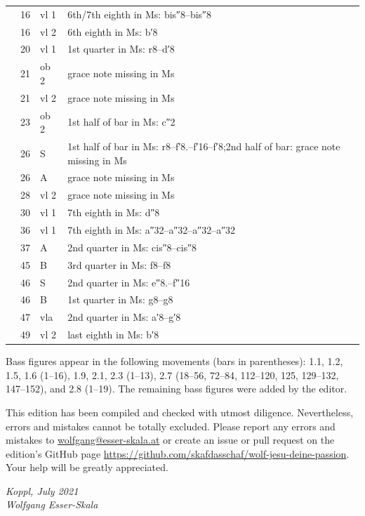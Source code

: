 \documentclass[parskip=full]{scrreprt}
\begin{document}
\begin{longtable}{lll L{10cm}}
       & 16  & vl 1    & 6th/7th eighth in Ms: bis″8–bis″8 \\
       & 16  & vl 2    & 6th eighth in Ms: b′8 \\
       & 20  & vl 1    & 1st quarter in Ms: r8–d′8 \\
       & 21  & ob 2    & grace note missing in Ms \\
       & 21  & vl 2    & grace note missing in Ms \\
       & 23  & ob 2    & 1st half of bar in Ms: c″2 \\
       & 26  & S       & 1st half of bar in Ms: r8–f′8.–f′16–f′8;\newline 2nd half of bar: grace note missing in Ms \\
       & 26  & A       & grace note missing in Ms \\
       & 28  & vl 2    & grace note missing in Ms \\
       & 30  & vl 1    & 7th eighth in Ms: d″8 \\
       & 36  & vl 1    & 7th eighth in Ms: a″32–a″32–a″32–a″32 \\
       & 37  & A       & 2nd quarter in Ms: cis″8–cis″8 \\
       & 45  & B       & 3rd quarter in Ms: f8–f8 \\
       & 46  & S       & 2nd quarter in Ms: e″8.–f″16 \\
       & 46  & B       & 1st quarter in Ms: g8–g8 \\
       & 47  & vla     & 2nd quarter in Ms: a′8–g′8 \\
       & 49  & vl 2    & last eighth in Ms: b′8 \\
  \bottomrule
\end{longtable}

Bass figures appear in the following movements (bars in parentheses): 1.1, 1.2, 1.5, 1.6 (1–16), 1.9, 2.1, 2.3 (1–13), 2.7 (18–56, 72–84, 112–120, 125, 129–132, 147–152), and 2.8 (1–19). The remaining bass figures were added by the editor.

This edition has been compiled and checked with utmost diligence. Nevertheless, errors and mistakes cannot be totally excluded. Please report any errors and mistakes to \url{wolfgang@esser-skala.at} or create an issue or pull request on the edition’s GitHub page \url{https://github.com/skafdasschaf/wolf-jesu-deine-passion}. Your help will be greatly appreciated.

\bigskip
\textit{Koppl, July 2021\\
Wolfgang Esser-Skala}
\end{document}
